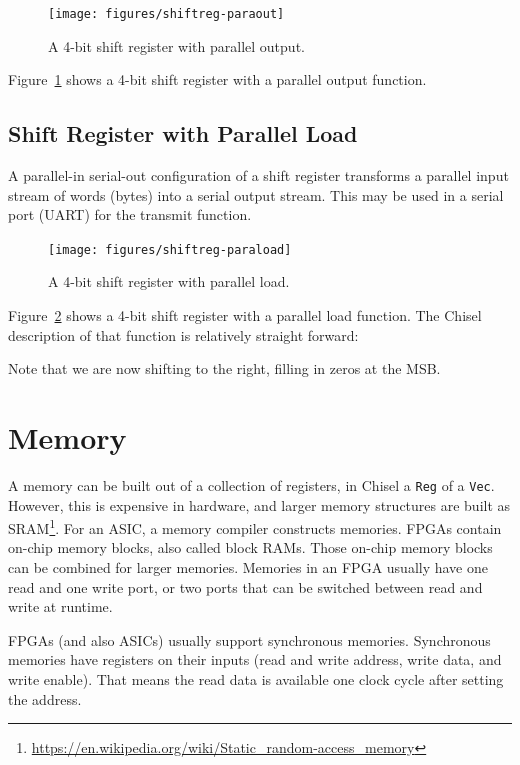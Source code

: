 \documentclass[%
    10pt,
    headinclude, footexclude,
    openright, %
    notitlepage,
    cleardoubleempty,
    headsepline,
    pointlessnumbers,
    bibtotoc, idxtotoc,
    ]{scrbook}
\newcommand{\code}[1]{{\small{\texttt{#1}}}}
\newcommand{\myref}[2]{\href{#1}{#2}}
\renewcommand{\myref}[2]{{#2}{\footnote{\url{#1}}}}
\begin{document}

\begin{figure}
  \centering
  \texttt{[image: figures/shiftreg-paraout]}
  \caption{A 4-bit shift register with parallel output.}
  \label{fig:shiftreg-paraout}
\end{figure}

\noindent Figure~\ref{fig:shiftreg-paraout} shows a 4-bit shift register with a parallel output function.

\subsection{Shift Register with Parallel Load}

A parallel-in serial-out configuration of a shift register transforms a parallel input stream of words (bytes)
into a serial output stream.
This may be used in a serial port (UART) for the transmit function.

\begin{figure}
  \centering
  \texttt{[image: figures/shiftreg-paraload]}
  \caption{A 4-bit shift register with parallel load.}
  \label{fig:shiftreg-paraload}
\end{figure}

Figure~\ref{fig:shiftreg-paraload} shows a 4-bit shift register with a parallel load function.
The Chisel description of that function is relatively straight forward:


Note that we are now shifting to the right, filling in zeros at the MSB.

\section{Memory}

A memory can be built out of a collection of registers, in Chisel a \code{Reg} of a \code{Vec}.
However, this is expensive in hardware, and larger memory structures are built
as \myref{https://en.wikipedia.org/wiki/Static_random-access_memory}{SRAM}.
For an ASIC, a memory compiler constructs memories.
FPGAs contain on-chip memory blocks, also called block RAMs.
Those on-chip memory blocks can be combined for larger memories.
Memories in an FPGA usually have one read and one write port, or
two ports that can be switched between read and write at runtime.

FPGAs (and also ASICs) usually support synchronous memories.
Synchronous memories have registers on their inputs (read and write address, write data,
and write enable). That means the read data is available one clock
cycle after setting the address.
\end{document}
